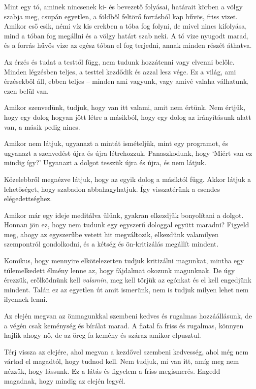 Mint egy tó, aminek nincsenek ki- és bevezető folyásai, határait körben
a völgy szabja meg, csupán egyetlen, a földből feltörő forrásból kap
hűvös, friss vizet. Amikor eső esik, némi víz kis erekben a tóba fog
folyni, de mivel nincs kifolyása, mind a tóban fog megállni és a völgy
határt szab neki. A tó vize nyugodt marad, és a forrás hűvös vize az
egész tóban el fog terjedni, annak minden részét áthatva.

Az érzés és tudat a testtől függ, nem tudunk hozzátenni vagy elvenni
belőle. Minden légzésben teljes, a testtel kezdődik és azzal lesz vége.
Ez a világ, ami érzésekből áll, ebben teljes -- minden ami vagyunk, vagy
amivé valaha válhatunk, ezen belül van.

Amikor szenvedünk, tudjuk, hogy van itt valami, amit nem értünk. Nem
értjük, hogy egy dolog hogyan jött létre a másikból, hogy egy dolog az
irányításunk alatt van, a másik pedig nincs.

Amikor nem látjuk, ugyanazt a mintát ismételjük, mint egy programot, és
ugyanazt a szenvedést újra és újra létrehozzuk. Panaszkodunk, hogy
`Miért van ez mindig így?' Ugyanazt a dolgot tesszük újra és újra, és
nem látjuk.

Közelebbről megnézve látjuk, hogy az egyik dolog a másiktól függ. Akkor
látjuk a lehetőséget, hogy szabadon abbahagyhatjuk. Így visszatérünk a
csendes elégedettséghez.

Amikor már egy ideje meditálva ülünk, gyakran elkezdjük bonyolítani a
dolgot. Honnan jön ez, hogy nem tudunk egy egyszerű dologgal együtt
maradni? Figyeld meg, ahogy az egyszerűbe vetett hit megváltozik,
elkezdünk valamilyen szempontról gondolkodni, és a kétség és
ön-kritizálás megállít mindent.

Komikus, hogy mennyire elkötelezetten tudjuk kritizálni magunkat, mintha
egy túlemelkedett élmény lenne az, hogy fájdalmat okozunk magunknak. De
úgy érezzük, erőlködnünk kell \emph{valamin}, meg kell törjük az egónkat
és el kell engedjünk mindent. Talán ez az egyetlen út amit ismerünk, nem
is tudjuk milyen lehet nem ilyennek lenni.

Az elején megvan az önmagunkkal szembeni kedves és rugalmas
hozzáállásunk, de a végén csak keménység és bírálat marad. A fiatal fa
friss és rugalmas, könnyen hajlik ahogy nő, de az öreg fa kemény és
száraz amikor elpusztul.

Térj vissza az elejére, ahol megvan a kezdővel szembeni kedvesség, ahol
még nem vártad el magadtól, hogy tudnod kell. Nem tudjuk, mi van itt,
amíg meg nem nézzük, hogy lássunk. Ez a látás és figyelem a friss
megismerés. Engedd magadnak, hogy mindig az elején legyél.
